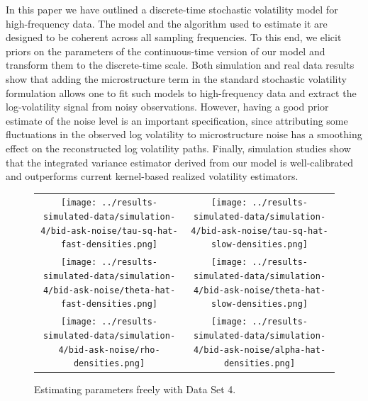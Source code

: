 \documentclass[10pt]{article}
\begin{document}
In this paper we have outlined a discrete-time stochastic volatility model for high-frequency data. The model and the algorithm used to estimate it are designed to be coherent across all sampling frequencies. To this end, we elicit priors on the parameters of the continuous-time version of our model and transform them to the discrete-time scale. Both simulation and real data results show that adding the microstructure term in the standard stochastic volatility formulation allows one to fit such models to high-frequency data and extract the log-volatility signal from noisy observations. However, having a good prior estimate of the noise level is an important specification, since attributing some fluctuations in the observed log volatility to microstructure noise has a smoothing effect on the reconstructed log volatility paths. Finally, simulation studies show that the integrated variance estimator derived from our model is well-calibrated and outperforms current kernel-based realized volatility estimators.


\begin{figure}
  \centering
  \begin{tabular}{cc}
    \begin{minipage}{0.45\textwidth}
      \centering
      \texttt{[image: ../results-simulated-data/simulation-4/bid-ask-noise/tau-sq-hat-fast-densities.png]}
    \end{minipage}
    & \begin{minipage}{0.45\textwidth}
      \centering
      \texttt{[image: ../results-simulated-data/simulation-4/bid-ask-noise/tau-sq-hat-slow-densities.png]}
      \end{minipage} \\
    \begin{minipage}{0.45\textwidth}
      \centering
      \texttt{[image: ../results-simulated-data/simulation-4/bid-ask-noise/theta-hat-fast-densities.png]}
    \end{minipage}
    & \begin{minipage}{0.45\textwidth}
      \centering
      \texttt{[image: ../results-simulated-data/simulation-4/bid-ask-noise/theta-hat-slow-densities.png]}
    \end{minipage} \\
    \begin{minipage}{0.45\textwidth}
      \centering
      \texttt{[image: ../results-simulated-data/simulation-4/bid-ask-noise/rho-densities.png]}
    \end{minipage}
    & \begin{minipage}{0.45\textwidth}
      \centering
      \texttt{[image: ../results-simulated-data/simulation-4/bid-ask-noise/alpha-hat-densities.png]}
    \end{minipage}
  \end{tabular}
  \caption{Estimating parameters freely with Data Set 4.}
\end{figure}
\end{document}
